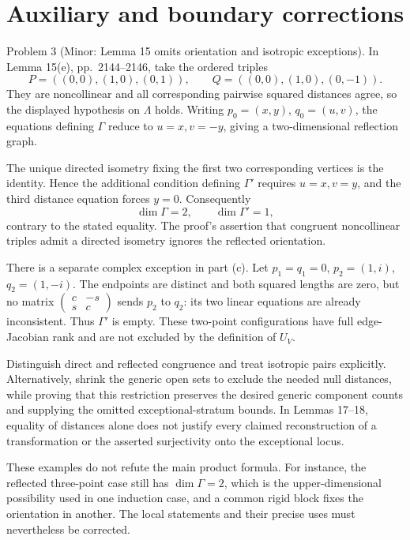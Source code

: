 \documentclass[10pt]{article}
\begin{document}
\section*{Auxiliary and boundary corrections}
Problem 3 (Minor: Lemma 15 omits orientation and isotropic exceptions).  In Lemma 15(e), pp. 2144–2146, take the ordered triples \[P=((0,0),(1,0),(0,1)),\qquad
 Q=((0,0),(1,0),(0,-1)).\] They are noncollinear and all corresponding pairwise squared distances agree, so the displayed hypothesis on \(\Lambda\) holds. Writing \(p_0=(x,y)\), \(q_0=(u,v)\), the equations defining \(\Gamma\) reduce to \(u=x,v=-y\), giving a two-dimensional reflection graph.\par
The unique directed isometry fixing the first two corresponding vertices is the identity. Hence the additional condition defining \(\Gamma'\) requires \(u=x,v=y\), and the third distance equation forces \(y=0\). Consequently \[\dim\Gamma=2,\qquad \dim\Gamma'=1,\] contrary to the stated equality. The proof’s assertion that congruent noncollinear triples admit a directed isometry ignores the reflected orientation.\par
There is a separate complex exception in part (c). Let \(p_1=q_1=0\), \(p_2=(1,i)\), \(q_2=(1,-i)\). The endpoints are distinct and both squared lengths are zero, but no matrix \(\left(\begin{smallmatrix}c&-s\\s&c\end{smallmatrix}\right)\) sends \(p_2\) to \(q_2\): its two linear equations are already inconsistent. Thus \(\Gamma'\) is empty. These two-point configurations have full edge-Jacobian rank and are not excluded by the definition of \(U_V\).\par
Distinguish direct and reflected congruence and treat isotropic pairs explicitly. Alternatively, shrink the generic open sets to exclude the needed null distances, while proving that this restriction preserves the desired generic component counts and supplying the omitted exceptional-stratum bounds. In Lemmas 17–18, equality of distances alone does not justify every claimed reconstruction of a transformation or the asserted surjectivity onto the exceptional locus.\par
These examples do not refute the main product formula. For instance, the reflected three-point case still has \(\dim\Gamma=2\), which is the upper-dimensional possibility used in one induction case, and a common rigid block fixes the orientation in another. The local statements and their precise uses must nevertheless be corrected.\par
\end{document}
